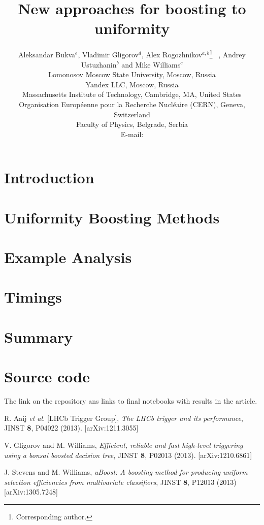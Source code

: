 \documentclass{JINST}
\title{New approaches for boosting to uniformity}
\author{
Aleksandar Bukva$^e$, 
Vladimir Gligorov$^d$,
Alex Rogozhnikov$^{a,b}$\thanks{Corresponding author.}~ ,
Andrey Ustuzhanin$^b$ and
Mike Williams$^c$\\
\llap{$^a$}Lomonosov Moscow State University, Moscow, Russia\\
\llap{$^b$}Yandex LLC, Moscow, Russia\\
\llap{$^c$}Massachusetts Institute of Technology, Cambridge, MA, United States \\
\llap{$^d$}Organisation Europ\'eenne pour la Recherche Nucl\'eaire (CERN), Geneva, Switzerland  \\
\llap{$^e$}Faculty of Physics, Belgrade, Serbia \\
E-mail: \email{alex.rogozhnikov@yandex.ru}}
\theoremstyle{definition}
\theoremstyle{remark}
\begin{document}
\maketitle


\section{Introduction}



\section{Uniformity Boosting Methods}


\section{Example Analysis}




\section{Timings}



\section{Summary}



\section{Source code}


The link on the repository ans links to final notebooks with results in the article.

\acknowledgments



\begin{thebibliography}{9}

 R. Aaij {\em et al.} [LHCb Trigger Group], {\em The LHCb trigger and its performance}, JINST {\bf 8}, P04022 (2013). [arXiv:1211.3055]

  V. Gligorov and M. Williams, {\em Efficient, reliable and fast high-level triggering using a bonsai boosted decision tree}, JINST {\bf 8}, P02013 (2013). [arXiv:1210.6861]

 J. Stevens and M. Williams, {\em uBoost: A boosting method for producing uniform selection efficiencies from multivariate classifiers}, JINST {\bf 8}, P12013 (2013) [arXiv:1305.7248]


\end{thebibliography}
\end{document}
